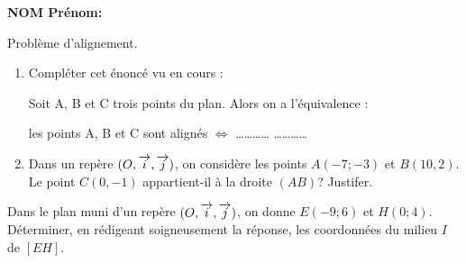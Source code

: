 \documentclass[a4paper,11pt,DIV15,BCOR0mm]{scrartcl}
\begin{document}
\noindent\textbf{NOM Prénom: }


\begin{exercice}
Problème d'alignement.
\begin{enumerate}
\item Compléter cet énoncé vu en cours :

Soit A, B et C trois points du plan. Alors on a l'équivalence :

les points A, B et C sont alignés $\Leftrightarrow$ \ldots\ldots\ldots\ldots
\ldots\ldots\ldots\ldots

\item Dans un repère $(O,\overrightarrow{i},\overrightarrow{j})$, on considère les points $A(-7;-3)$ et $B(10,2)$.
Le point $C(0,-1)$ appartient-il à la droite $(AB)$? Justifer.
\end{enumerate}
\end{exercice}
\vfill


\begin{exercice}
Dans le plan muni  d'un repère $(O,\overrightarrow{i},\overrightarrow{j})$, on donne $E(-9;6)$ et
$H(0;4)$. Déterminer, en rédigeant soigneusement la réponse,
les coordonnées du milieu $I$ de $[EH]$.
\vfill
\end{exercice}
\end{document}
